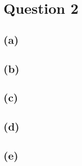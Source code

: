 \documentclass[class=article]{standalone}
\begin{document}
\section*{Question 2}
\subsection*{(a)}
\subsection*{(b)}
\subsection*{(c)}
\subsection*{(d)}
\subsection*{(e)}
\end{document}

